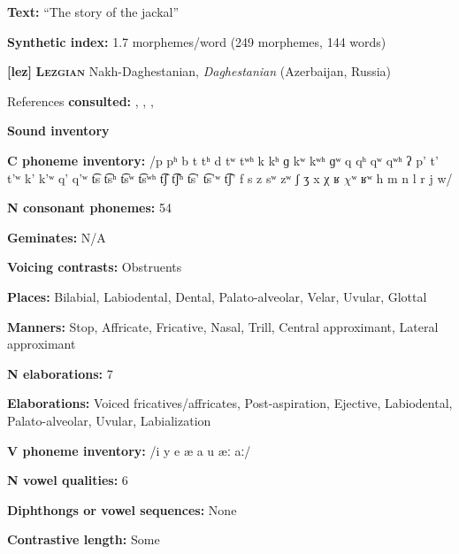 \textbf{Text:} “The story of the jackal” \citep[165-168]{Plaisier2007}



\textbf{Synthetic index:} 1.7 morphemes/word (249 morphemes, 144 words)



\textbf{[lez]}   \textbf{\textsc{Lezgian}}  Nakh-Daghestanian, \textit{Daghestanian} (Azerbaijan, Russia)



References \textbf{consulted:} \citet{ChitoranBabaliyeva2007}, \citet{Haspelmath1993}, \citet{Kodzasov1990}, \citet{Yu2004}



\textbf{Sound inventory}



\textbf{C phoneme inventory:} /p pʰ b t tʰ d tʷ tʷʰ k kʰ ɡ kʷ kʷʰ ɡʷ q qʰ qʷ qʷʰ ʔ p’ t’ t’ʷ k’ k’ʷ q’ q’ʷ t͡s t͡sʰ t͡sʷ t͡sʷʰ t͡ʃ t͡ʃʰ t͡s’ t͡s’ʷ t͡ʃ’ f s z sʷ zʷ ʃ ʒ x χ ʁ $\chi ʷ$ ʁʷ h m n l r j w/



\textbf{N consonant phonemes:} 54



\textbf{Geminates:} N/A



\textbf{Voicing contrasts:} Obstruents



\textbf{Places:} Bilabial, Labiodental, Dental, Palato-alveolar, Velar, Uvular, Glottal



\textbf{Manners:} Stop, Affricate, Fricative, Nasal, Trill, Central approximant, Lateral approximant



\textbf{N elaborations:} 7



\textbf{Elaborations:} Voiced fricatives/affricates, Post-aspiration, Ejective, Labiodental, Palato-alveolar, Uvular, Labialization



\textbf{V phoneme inventory:} /i y e æ a u æː aː/



\textbf{N vowel qualities:} 6



\textbf{Diphthongs or vowel sequences:} None



\textbf{Contrastive length:} Some



